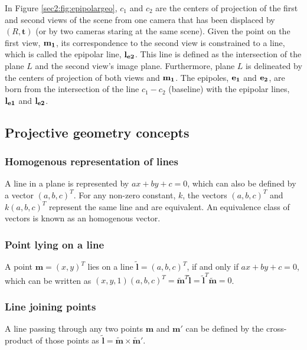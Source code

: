 In Figure \ref{sec2:fig:epipolargeo}, $c_1$ and $c_2$ are the centers of projection of the first and second views of the scene from one camera that has been displaced by $(R, \mathbf{t})$ (or by two cameras staring at the same scene). Given the point on the first view, $\bf m_1$, its correspondence to the second view is constrained to a line, which is called the epipolar line, $\bf l_{e2}$. This line is defined as the intersection of the plane $L$ and the second view's image plane. Furthermore, plane $L$ is delineated by the centers of projection of both views and $\bf m_1$. The epipoles, $\bf e_1$ and $\bf e_2$, are born from the intersection of the line $c_1 - c_2$ (baseline) with the epipolar lines, $\bf l_{e1}$ and $\bf l_{e2}$. 

\subsection{Projective geometry concepts}

\subsubsection{Homogenous representation of lines}
A line in a plane is represented by $a x + b y + c = 0$, which can also be defined by a vector $( a , b , c ) ^T$. For any non-zero constant, $k$, the vectors  $( a , b , c ) ^T$ and $k(a , b , c ) ^T$ represent the same line and are equivalent. An equivalence class of vectors is known as an homogenous vector. 

\subsubsection{Point lying on a line}

A point $\mathbf { m } = ( x , y ) ^ T$ lies on a line $\mathbf {\tilde{l}} = ( a , b , c ) ^ { T }$, if and only if $a x + b y + c = 0$, which can be written as $( x , y , 1 ) ( a , b , c ) ^T = \mathbf { \tilde{m} } ^T \mathbf {\tilde{l}} = \mathbf {\tilde{l}} ^T \mathbf { \tilde{m} } = 0$.

\subsubsection{Line joining points}
A line passing through any two points $\mathbf{m}$ and $\mathbf{m'}$ can be defined by the cross-product of those points as $\mathbf{\tilde{l}} = \mathbf{\tilde{m}} \times \mathbf{\tilde{m}'}$.

